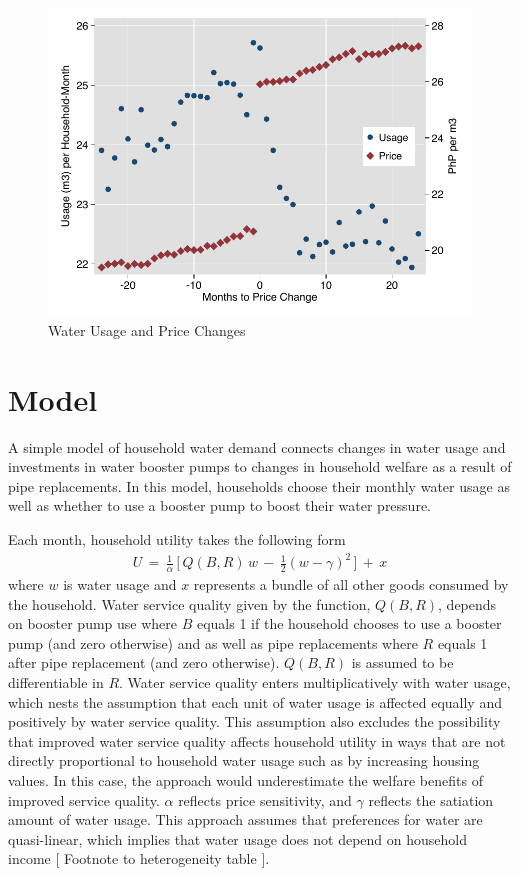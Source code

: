 \documentclass[12pt,table]{article}
\begin{document}
\begin{figure}
\begin{center}
\caption{Water Usage and Price Changes}\label{figure:usagepricechanges}
\includegraphics[scale=1]{tables/r_to_s_only_graph.pdf}
\end{center}
\end{figure}


\section{Model}\label{section:model}

A simple model of household water demand connects changes in water usage and investments in water booster pumps to changes in household welfare as a result of pipe replacements.  In this model, households choose their monthly water usage as well as whether to use a booster pump to boost their water pressure.  

Each month, household utility takes the following form
\begin{align}
\label{eq:utility}
U\,=\,\frac{1}{\alpha} \, \Big[ \,  Q(B,R) \,  w  \, -\, \frac{1}{2}(w - \gamma)^2 \, \Big] \, + \, x 
\end{align}
where $w$ is water usage and $x$ represents a bundle of all other goods consumed by the household.  Water service quality given by the function, $Q(B,R)$, depends on booster pump use where $B$ equals 1 if the household chooses to use a booster pump (and zero otherwise) and as well as pipe replacements where $R$ equals 1 after pipe replacement (and zero otherwise).  $Q(B,R)$ is assumed to be differentiable in $R$.  Water service quality enters multiplicatively with water usage, which nests the assumption that each unit of water usage is affected equally and positively by water service quality.  This assumption also excludes the possibility that improved water service quality affects household utility in ways that are not directly proportional to household water usage such as by increasing housing values.  In this case, the approach would underestimate the welfare benefits of improved service quality.  $\alpha$ reflects price sensitivity, and $\gamma$ reflects the satiation amount of water usage.  This approach assumes that preferences for water are quasi-linear, which implies that water usage does not depend on household income [ Footnote to heterogeneity table ].  
\end{document}
